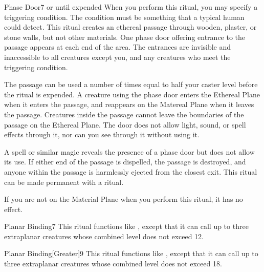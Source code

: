 \begin{spellsection}{Phase Door}{7}
\spelldur \durext or until expended
\spellspecial When you perform this ritual, you may specify a triggering condition. The condition must be something that a typical human could detect.
\spellline
\spelleffect This ritual creates an ethereal passage through wooden, plaster, or stone walls, but not other materials. One phase door offering entrance to the passage appears at each end of the area. The entrances are invisible and inaccessible to all creatures except you, and any creatures who meet the triggering condition.

The passage can be used a number of times equal to half your caster level before the ritual is expended. A creature using the phase door enters the Ethereal Plane when it enters the passage, and reappears on the Matereal Plane when it leaves the passage. Creatures inside the passage cannot leave the boundaries of the passage on the Ethereal Plane. The door does not allow light, sound, or spell effects through it, nor can you see through it without using it.

\spellnotes A  spell or similar magic reveals the presence of a phase door but does not allow its use. If either end of the passage is dispelled, the passage is destroyed, and anyone within the passage is harmlessly ejected from the closest exit. This ritual can be made permanent with a  ritual.

If you are not on the Material Plane when you perform this ritual, it has no effect.
\end{spellsection}

\begin{spellsection}{Planar Binding}{7}
\spellspecial This ritual functions like , except that it can call up to three extraplanar creatures whose combined level does not exceed 12.
\end{spellsection}

\begin{spellsection}{Planar Binding}[Greater]{9}
\spellspecial This ritual functions like , except that it can call up to three extraplanar creatures whose combined level does not exceed 18.
\end{spellsection}

